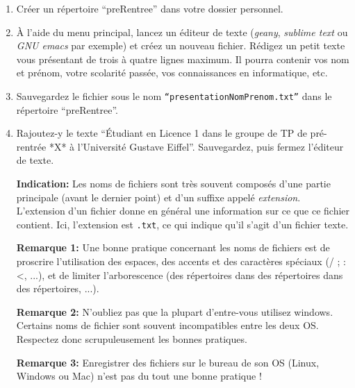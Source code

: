 \documentclass{article}
\begin{document}
\begin{exercice}

\begin{enumerate}
\item Créer un répertoire ``preRentree'' dans votre dossier personnel.
\item À l'aide du menu principal, lancez un éditeur de texte (\emph{geany}, \emph{sublime text} ou \emph{GNU emacs} par exemple) et créez un nouveau fichier. Rédigez un petit texte vous présentant de trois à quatre lignes maximum. Il pourra contenir vos nom et prénom, votre scolarité passée, vos connaissances en informatique, etc.
\item Sauvegardez le fichier sous le nom \texttt{``presentationNomPrenom.txt''} dans le répertoire ``preRentree''.
\item Rajoutez-y le texte ``Étudiant en Licence 1 dans le groupe de TP de pré-rentrée *X* à l'Université Gustave Eiffel''. Sauvegardez, puis fermez l'éditeur de texte.

\medskip

    \textbf{Indication: }Les noms de fichiers sont très souvent composés d'une partie principale (avant le dernier point) et d'un suffixe appelé \emph{extension}.
    L'extension d'un fichier donne en général une information sur ce que ce
    fichier contient. Ici, l'extension est \texttt{.txt}, ce qui indique qu'il s'agit
    d'un fichier texte. 
    
\medskip    
    
    \textbf{Remarque 1: }Une bonne pratique concernant les noms de fichiers est de proscrire
    l'utilisation des espaces, des accents et des caractères spéciaux (/ ; : <, ...), et de limiter l'arborescence (des répertoires dans des répertoires dans des répertoires, ...).

\medskip    
    
    \textbf{Remarque 2: }N'oubliez pas que la plupart d'entre-vous utilisez windows. Certains noms de fichier sont souvent incompatibles entre les deux OS. Respectez donc scrupuleusement les bonnes pratiques.

\medskip    
    
    \textbf{Remarque 3: }Enregistrer des fichiers sur le bureau de son OS (Linux, Windows ou Mac) n'est pas du tout une bonne pratique ! 
    
\end{enumerate}

\newpage

\end{exercice}
\end{document}
